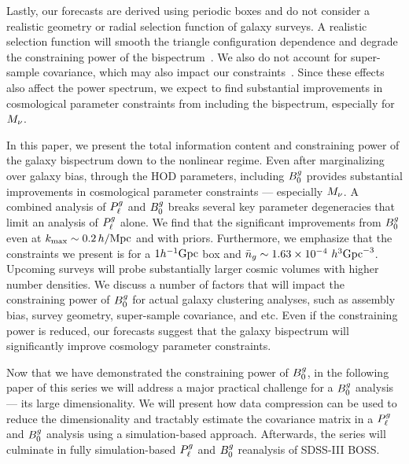 Lastly, our forecasts are derived using periodic boxes and do not consider a
realistic geometry or radial selection function of galaxy surveys. A realistic 
selection function will smooth the triangle configuration dependence and degrade 
the constraining power of the bispectrum~\citep{sefusatti2005}. We also do not
account for super-sample covariance, which may also impact our
constraints~\citep{hamilton2006, sefusatti2006, takada2013, li2018, wadekar2019}. 
Since these effects also affect the power spectrum, we expect to find
substantial improvements in cosmological parameter constraints from including
the bispectrum, especially for $M_\nu$. 

In this paper, we present the total information content and constraining power
of the galaxy bispectrum down to the nonlinear regime. Even after marginalizing
over galaxy bias, through the HOD parameters, including $B^g_0$ provides substantial
improvements in cosmological parameter constraints --- especially $M_\nu$.
A combined analysis of $P^g_{\ell}$ and $B^g_0$ breaks several key parameter degeneracies
that limit an analysis of $P^g_{\ell}$ alone. We find that the significant
improvements from $B^g_0$ even at $k_{\rm max} \sim 0.2\,h/\mathrm{Mpc}$ and with \planck priors. 
Furthermore, we emphasize that the constraints we present is for a $1h^{-1}{\rm Gpc}$ 
box and $\bar{n}_g \sim 1.63\times 10^{-4}~h^3{\rm Gpc}^{-3}$. Upcoming surveys
will probe substantially larger cosmic volumes with higher number densities.
We discuss a number of factors that will impact the constraining power of $B^g_0$
for actual galaxy clustering analyses, such as assembly bias, survey geometry,
super-sample covariance, and etc. Even if the constraining power is reduced,
our forecasts suggest that the galaxy bispectrum will significantly improve
cosmology parameter constraints.

Now that we have demonstrated the constraining power of $B^g_0$, in the following 
paper of this series we will address a major practical challenge for a $B^g_0$
analysis --- its large dimensionality. We will present how data compression can
be used to reduce the dimensionality and tractably estimate the covariance
matrix in a $P^g_{\ell}$ and $B^g_0$ analysis using a simulation-based approach. Afterwards, 
the series will culminate in fully simulation-based $P^g_{\ell}$ and $B^g_0$
reanalysis of SDSS-III BOSS. 


